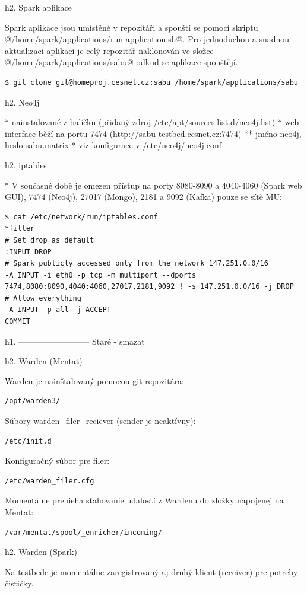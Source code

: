 \documentclass[a4paper]{article} %
\begin{document}
h2. Spark aplikace

Spark aplikace jsou umístěné v repozitáři a spouští se pomocí skriptu @/home/spark/applications/run-application.sh@.
Pro jednoduchou a snadnou aktualizaci aplikací je celý repozitář naklonován ve složce @/home/spark/applications/sabu@ odkud se aplikace spouštějí.

\begin{lstlisting}[]
$ git clone git@homeproj.cesnet.cz:sabu /home/spark/applications/sabu
\end{lstlisting}

h2. Neo4j

* nainstalované z balíčku (přidaný zdroj /etc/apt/sources.list.d/neo4j.list)
* web interface běží na portu 7474 (http://sabu-testbed.cesnet.cz:7474)
** jméno neo4j, heslo sabu.matrix
* viz konfigurace v /etc/neo4j/neo4j.conf

h2. iptables

* V současné době je omezen přístup na porty 8080-8090 a 4040-4060 (Spark web GUI), 7474 (Neo4j), 27017 (Mongo), 2181 a 9092 (Kafka) pouze se sítě MU:
\begin{lstlisting}[]
$ cat /etc/network/run/iptables.conf
*filter
# Set drop as default
:INPUT DROP
# Spark publicly accessed only from the network 147.251.0.0/16
-A INPUT -i eth0 -p tcp -m multiport --dports 7474,8080:8090,4040:4060,27017,2181,9092 ! -s 147.251.0.0/16 -j DROP
# Allow everything
-A INPUT -p all -j ACCEPT
COMMIT
\end{lstlisting}

h1. --------------------------
Staré - smazat

h2. Warden (Mentat)

Warden je nainštalovaný pomocou git repozitára:
\begin{lstlisting}[]/opt/warden3/\end{lstlisting}
Súbory warden_filer_reciever (sender je neaktívny):
\begin{lstlisting}[]/etc/init.d\end{lstlisting}
Konfiguračný súbor pre filer:
\begin{lstlisting}[]/etc/warden_filer.cfg\end{lstlisting}
Momentálne prebieha sťahovanie udalostí z Wardenu do zložky napojenej na Mentat:
\begin{lstlisting}[]/var/mentat/spool/_enricher/incoming/\end{lstlisting}

h2. Warden (Spark)

Na testbede je momentálne zaregistrovaný aj druhý klient (receiver) pre potreby čističky.
\end{document}
